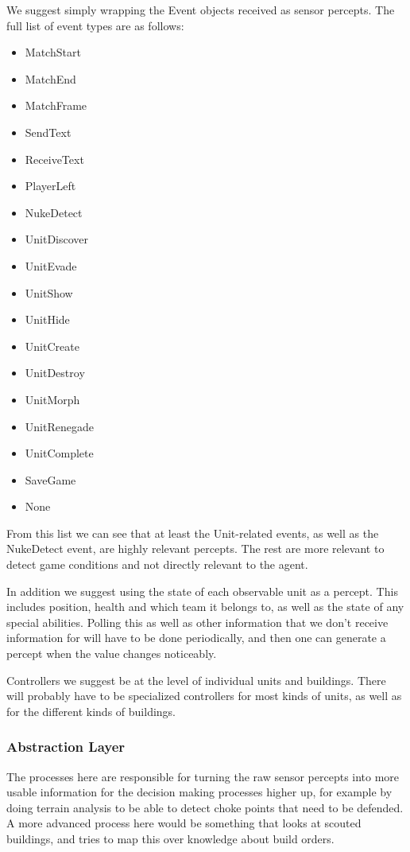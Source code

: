 We suggest simply wrapping the Event objects received as sensor percepts. The
full list of event types are as follows:
\begin{multicols}{2}
\begin{itemize}
    \item MatchStart
    \item MatchEnd
    \item MatchFrame
    \item SendText
    \item ReceiveText
    \item PlayerLeft
    \item NukeDetect
    \item UnitDiscover
    \item UnitEvade
    \item UnitShow
    \item UnitHide
    \item UnitCreate
    \item UnitDestroy
    \item UnitMorph
    \item UnitRenegade
    \item UnitComplete
    \item SaveGame
    \item None 
\end{itemize}
\end{multicols}
From this list we can see that at least the Unit-related events, as well as the
NukeDetect event, are highly relevant percepts. The rest are more relevant to
detect game conditions and not directly relevant to the agent.

In addition we suggest using the state of each observable unit as a percept.
This includes position, health and which team it belongs to, as well as the
state of any special abilities. Polling this as well as other information that
we don't receive information for will have to be done periodically, and then
one can generate a percept when the value changes noticeably.

Controllers we suggest be at the level of individual units and buildings. There
will probably have to be specialized controllers for most kinds of units, as
well as for the different kinds of buildings.

\subsubsection{Abstraction Layer}
The processes here are responsible for turning the raw sensor percepts into
more usable information for the decision making processes higher up, for
example by doing terrain analysis to be able to detect choke points that need
to be defended. A more advanced process here would be something that looks at
scouted buildings, and tries to map this over knowledge about build orders.

